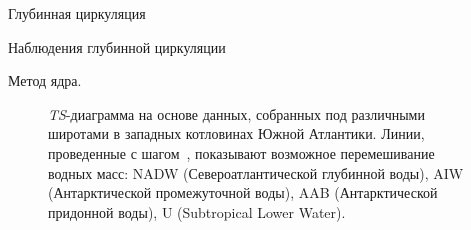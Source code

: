 \begin{chapter}{Глубинная циркуляция}
\begin{section}{Наблюдения глубинной циркуляции}
\begin{paragraph}{Метод ядра.}

\begin{figure}[t!]
\caption{\emph{TS}-диаграмма на основе данных, собранных под различными 
широтами в западных котловинах Южной Атлантики. Линии, проведенные 
с шагом~, показывают возможное 
перемешивание водных масс:
NADW (Североатлантической глубинной воды), AIW (Антарктической промежуточной
воды), AAB (Антарктической придонной воды), 
U (Subtropical Lower Water).}
\label{fig:WesternBasinsTS}
\end{figure}
%


\end{paragraph}
\end{section}
\end{chapter}
